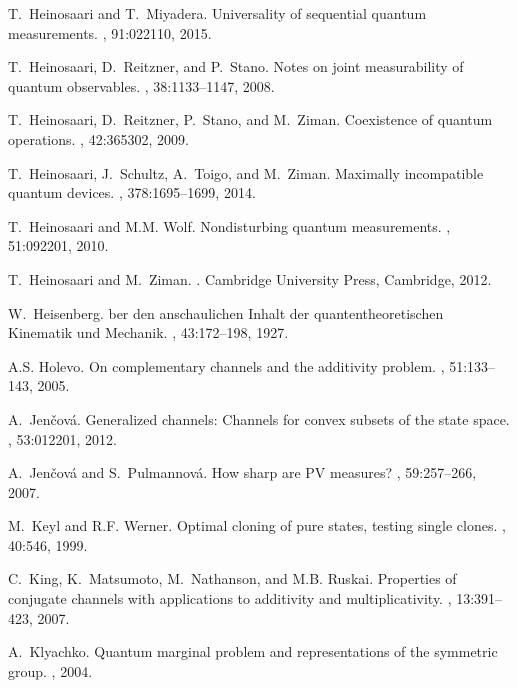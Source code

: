 \documentclass[12pt]{iopart}
\theoremstyle{definition}
\begin{document}
{\begin{thebibliography}{10}
T.~Heinosaari and T.~Miyadera.
\newblock Universality of sequential quantum measurements.
, 91:022110, 2015.

T.~Heinosaari, D.~Reitzner, and P.~Stano.
\newblock Notes on joint measurability of quantum observables.
, 38:1133--1147, 2008.

T.~Heinosaari, D.~Reitzner, P.~Stano, and M.~Ziman.
\newblock Coexistence of quantum operations.
, 42:365302, 2009.

T.~Heinosaari, J.~Schultz, A.~Toigo, and M.~Ziman.
\newblock Maximally incompatible quantum devices.
, 378:1695--1699, 2014.

T.~Heinosaari and M.M. Wolf.
\newblock Nondisturbing quantum measurements.
, 51:092201, 2010.

T.~Heinosaari and M.~Ziman.
.
\newblock Cambridge University Press, Cambridge, 2012.

W.~Heisenberg.
ber den anschaulichen {I}nhalt der quantentheoretischen
  {K}inematik und {M}echanik.
, 43:172--198, 1927.

A.S. Holevo.
\newblock On complementary channels and the additivity problem.
, 51:133--143, 2005.

A.~Jen{\v{c}}ov\'a.
\newblock Generalized channels: {C}hannels for convex subsets of the state
  space.
, 53:012201, 2012.

A.~Jen\v{c}ov{\'a} and S.~Pulmannov{\'a}.
\newblock How sharp are {PV} measures?
, 59:257--266, 2007.

M.~Keyl and R.F. Werner.
\newblock Optimal cloning of pure states, testing single clones.
, 40:546, 1999.

C.~King, K.~Matsumoto, M.~Nathanson, and M.B. Ruskai.
\newblock Properties of conjugate channels with applications to additivity and
  multiplicativity.
, 13:391--423, 2007.

A.~Klyachko.
\newblock Quantum marginal problem and representations of the symmetric group.
, 2004.


\end{thebibliography}}
\end{document}
